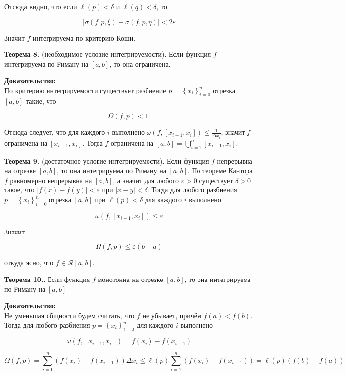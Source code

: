 \documentclass[a4paper,12pt]{article} %
\begin{document}
	Отсюда видно, что если $\ell(p)<\delta$ и $\ell(q)<\delta$, то
	
	$$
	|\sigma(f, p, \xi)-\sigma(f, p, \eta)|<2 \varepsilon
	$$
	
	Значит $f$ интегрируема по критерию Коши.
	
	\textbf{Теорема 8.} (необходимое условие интегрируемости). Если функция $f$ интегрируема по Риману на $[a, b]$, то она ограничена.
	
	\textbf{Доказательство:\\}
	По критерию интегрируемости существует разбиение $p=\left\{x_{i}\right\}_{i=0}^{n}$ отрезка $[a, b]$ такие, что
	
	$$
	\Omega(f, p)<1 .
	$$
	
	Отсюда следует, что для каждого $i$ выполнено $\omega\left(f,\left[x_{i-1}, x_{i}\right]\right) \leq \frac{1}{\Delta x_{i}}$, значит $f$ ограничена на $\left[x_{i-1}, x_{i}\right]$. Тогда $f$ ограничена на $[a, b]=\bigcup_{i=1}^{n}\left[x_{i-1}, x_{i}\right]$.
	
	\textbf{Теорема 9.} (достаточное условие интегрируемости). Если функция $f$ непрерывна на отрезке $[a, b]$, то она интегрируема по Риману на $[a, b]$. По теореме Кантора $f$ равномерно непрерывна на $[a, b]$, а значит для любого $\varepsilon>0$ существует $\delta>0$ такое, что $|f(x)-f(y)|<\varepsilon$ при $|x-y|<\delta$. Тогда для любого разбиения $p=\left\{x_{i}\right\}_{i=0}^{n}$ отрезка $[a, b]$ при $\ell(p)<\delta$ для каждого $i$ выполнено
	
	$$
	\omega\left(f,\left[x_{i-1}, x_{i}\right]\right) \leq \varepsilon
	$$
	
	Значит
	
	$$
	\Omega(f, p) \leq \varepsilon(b-a)
	$$
	
	откуда ясно, что $f \in \mathcal{R}[a, b]$.
	
	\textbf{Теорема 10.}. Если функция $f$ монотонна на отрезке $[a, b]$, то она интегрируема по Риману на $[a, b]$
	
	\textbf{Доказательство:\\}
	Не уменьшая общности будем считать, что $f$ не убывает, причём $f(a)<f(b)$. Тогда для любого разбиения $p=\left\{x_{i}\right\}_{i=0}^{n}$ для каждого $i$ выполнено
	
	$$
	\omega\left(f,\left[x_{i-1}, x_{i}\right]\right)=f\left(x_{i}\right)-f\left(x_{i-1}\right)
	$$
	
	
	$$\Omega(f, p)=\sum_{i=1}^{n}\left(f\left(x_{i}\right)-f\left(x_{i-1}\right)\right) \Delta x_{i} \leq \ell(p) \sum_{i=1}^{n}\left(f\left(x_{i}\right)-f\left(x_{i-1}\right)\right)=\ell(p)(f(b)-f(a))$$
	
\end{document}
